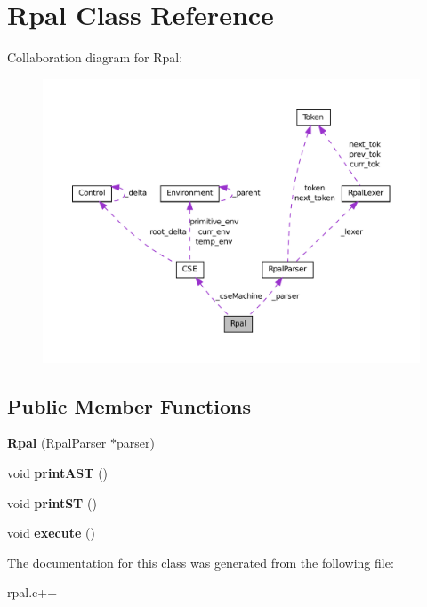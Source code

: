 \hypertarget{classRpal}{
\section{Rpal Class Reference}
\label{classRpal}
}


Collaboration diagram for Rpal:\nopagebreak
\begin{figure}[H]
\begin{center}
\leavevmode
\includegraphics[width=400pt]{classRpal__coll__graph}
\end{center}
\end{figure}
\subsection*{Public Member Functions}
\begin{DoxyCompactItemize}
\item 
\hypertarget{classRpal_a974dfca706a0b14239c882a9205f2042}{
{\bfseries Rpal} (\hyperlink{classRpalParser}{RpalParser} $\ast$parser)}
\label{classRpal_a974dfca706a0b14239c882a9205f2042}

\item 
\hypertarget{classRpal_a0ffb4c66518df139fb848906b13dac0d}{
void {\bfseries printAST} ()}
\label{classRpal_a0ffb4c66518df139fb848906b13dac0d}

\item 
\hypertarget{classRpal_acb2e83e6257ad29b56c4c1927ce24c1a}{
void {\bfseries printST} ()}
\label{classRpal_acb2e83e6257ad29b56c4c1927ce24c1a}

\item 
\hypertarget{classRpal_ab04297169437ac8825c424f5c90e2fc8}{
void {\bfseries execute} ()}
\label{classRpal_ab04297169437ac8825c424f5c90e2fc8}

\end{DoxyCompactItemize}


The documentation for this class was generated from the following file:\begin{DoxyCompactItemize}
\item 
rpal.c++\end{DoxyCompactItemize}
